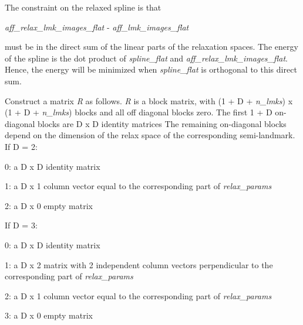 The constraint on the relaxed spline is that \begin{center} {\itshape aff\_\-relax\_\-lmk\_\-images\_\-flat\/} -\/ {\itshape aff\_\-lmk\_\-images\_\-flat\/} \end{center}  must be in the direct sum of the linear parts of the relaxation spaces. The energy of the spline is the dot product of {\itshape spline\_\-flat\/} and {\itshape aff\_\-relax\_\-lmk\_\-images\_\-flat\/}. Hence, the energy will be minimized when {\itshape spline\_\-flat\/} is orthogonal to this direct sum.

Construct a matrix {\itshape R\/} as follows. {\itshape R\/} is a block matrix, with (1 + D + {\itshape n\_\-lmks\/}) x (1 + D + {\itshape n\_\-lmks\/}) blocks and all off diagonal blocks zero. The first 1 + D on-\/diagonal blocks are D x D identity matrices The remaining on-\/diagonal blocks depend on the dimension of the relax space of the corresponding semi-\/landmark. If D = 2:
\begin{DoxyItemize}
\item 0: a D x D identity matrix
\item 1: a D x 1 column vector equal to the corresponding part of {\itshape relax\_\-params\/} 
\item 2: a D x 0 empty matrix
\end{DoxyItemize}

If D = 3:
\begin{DoxyItemize}
\item 0: a D x D identity matrix
\item 1: a D x 2 matrix with 2 independent column vectors perpendicular to the corresponding part of {\itshape relax\_\-params\/} 
\item 2: a D x 1 column vector equal to the corresponding part of {\itshape relax\_\-params\/} 
\item 3: a D x 0 empty matrix
\end{DoxyItemize}

